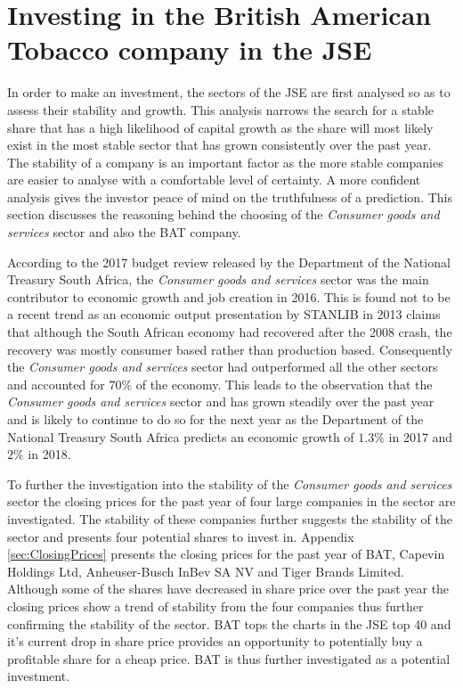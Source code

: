 \documentclass[letterpaper, 10 pt, conference]{ieeeconf}  %
\begin{document}
\section{Investing in the British American Tobacco company in the JSE}

In order to make an investment, the sectors of the JSE are first analysed so as to assess their stability and growth. This analysis narrows the search for a stable share that has a high likelihood of capital growth as the share will most likely exist in the most stable sector that has grown consistently over the past year. The stability of a company is an important factor as the more stable companies are easier to analyse with a comfortable level of certainty. A more confident analysis gives the investor peace of mind on the truthfulness of a prediction. This section discusses the reasoning behind the choosing of the \textit{Consumer goods and services} sector and also the BAT company.


According to the 2017 budget review \cite{budgetReview} released by the Department of the National Treasury South Africa, the \textit{Consumer goods and services} sector was the main contributor to economic growth and job creation in 2016. This is found not to be a recent trend as an economic output presentation by STANLIB in 2013 \cite{stanlibReport} claims that although the South African economy had recovered after the 2008 crash, the recovery was mostly consumer based rather than production based. Consequently the \textit{Consumer goods and services} sector had outperformed all the other sectors and accounted for $70\%$ of the economy. This leads to the observation that the \textit{Consumer goods and services} sector and has grown steadily over the past year and is likely to continue to do so for the next year as the Department of the National Treasury South Africa predicts an economic growth of $1.3\%$ in 2017 and $2\%$ in 2018.

To further the investigation into the stability of the \textit{Consumer goods and services} sector the closing prices for the past year of four large companies in the sector are investigated. The stability of these companies further suggests the stability of the sector and presents four potential shares to invest in. Appendix \ref{sec:ClosingPrices} presents the closing prices for  the past year of BAT,  Capevin Holdings Ltd, Anheuser-Busch InBev SA NV and Tiger Brands Limited. Although some of the shares have decreased in share price over the past year the closing prices show a trend of stability from the four companies thus further confirming the stability of the sector. BAT tops the charts in the JSE top 40 \cite{top40} and it's current drop in share price provides an opportunity to potentially buy a profitable share for a cheap price. BAT is thus further investigated as a potential investment.
 
\end{document}
